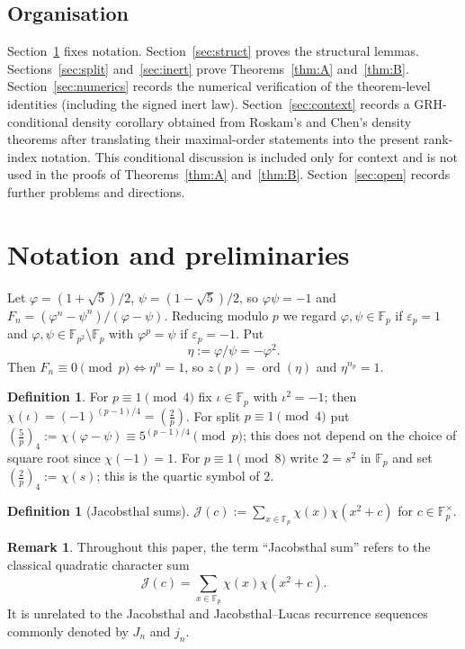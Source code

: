 \documentclass[11pt]{amsart}
\theoremstyle{plain}
\theoremstyle{definition}
\newtheorem{definition}[theorem]{Definition}
\newtheorem{remark}[theorem]{Remark}
\newcommand{\Fp}{\mathbb{F}_p}
\newcommand{\Fpp}{\mathbb{F}_{p^2}}
\newcommand{\leg}[2]{\left(\frac{#1}{#2}\right)}
\newcommand{\qleg}[2]{\left(\frac{#1}{#2}\right)_{\!4}}
\newcommand{\Jac}{\mathcal{J}}
\begin{document}
\subsection{Organisation}
Section~\ref{sec:prelim} fixes notation. Section~\ref{sec:struct}
proves the structural lemmas. Sections~\ref{sec:split}
and~\ref{sec:inert} prove Theorems~\ref{thm:A} and~\ref{thm:B}.
Section~\ref{sec:numerics} records the numerical verification of the
theorem-level identities (including the signed inert law).
Section~\ref{sec:context} records a GRH-conditional density corollary
obtained from Roskam's and Chen's density theorems after translating
their maximal-order statements into the present rank-index notation.
This conditional discussion is included only for context and is not used
in the proofs of Theorems~\ref{thm:A} and~\ref{thm:B}.
Section~\ref{sec:open} records further problems and directions.

\section{Notation and preliminaries}\label{sec:prelim}

Let $\varphi=(1+\sqrt5)/2$, $\psi=(1-\sqrt5)/2$, so $\varphi\psi=-1$ and
$F_n=(\varphi^n-\psi^n)/(\varphi-\psi)$. Reducing modulo $p$ we regard
$\varphi,\psi\in\Fp$ if $\varepsilon_p=1$ and $\varphi,\psi\in\Fpp\setminus\Fp$ with
$\varphi^p=\psi$ if $\varepsilon_p=-1$. Put
\[
  \eta:=\varphi/\psi=-\varphi^2 .
\]
Then $F_n\equiv0\pmod p\iff\eta^n=1$, so $z(p)=\operatorname{ord}(\eta)$ and
$\eta^{n_p}=1$.

\begin{definition}
For $p\equiv1\pmod4$ fix $\iota\in\Fp$ with $\iota^2=-1$; then
$\chi(\iota)=(-1)^{(p-1)/4}=\leg2p$. For split $p\equiv1\pmod4$ put
$\qleg5p:=\chi(\varphi-\psi)\equiv5^{(p-1)/4}\pmod p$; this does not depend on the
choice of square root since $\chi(-1)=1$. For $p\equiv1\pmod8$ write $2=s^2$
in $\Fp$ and set $\qleg2p:=\chi(s)$; this is the quartic symbol of $2$.
\end{definition}

\begin{definition}[Jacobsthal sums]\label{def:jacobsthal-sums}
$\Jac(c):=\sum_{x\in\Fp}\chi(x)\chi(x^2+c)$ for $c\in\Fp^{\times}$.
\end{definition}

\begin{remark}
Throughout this paper, the term ``Jacobsthal sum'' refers to the
classical quadratic character sum
\[
  \Jac(c)=\sum_{x\in\Fp}\chi(x)\chi(x^2+c).
\]
It is unrelated to the Jacobsthal and Jacobsthal--Lucas recurrence
sequences commonly denoted by $J_n$ and $j_n$.
\end{remark}
\end{document}
